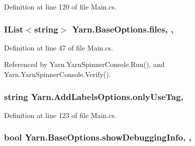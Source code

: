 Definition at line 120 of file Main.\-cs.

\hypertarget{a00031_aa93cbb1bc1d5328e0a417012621e92d2}{
\subsubsection[{files}]{\setlength{\rightskip}{0pt plus 5cm}I\-List$<$string$>$ Yarn.\-Base\-Options.\-files\hspace{0.3cm}{\ttfamily [get]}, {\ttfamily [set]}, {\ttfamily [inherited]}}}\label{a00031_aa93cbb1bc1d5328e0a417012621e92d2}


Definition at line 47 of file Main.\-cs.



Referenced by Yarn.\-Yarn\-Spinner\-Console.\-Run(), and Yarn.\-Yarn\-Spinner\-Console.\-Verify().

\hypertarget{a00027_ab6162338f9606a836f3101fe0e228249}{
\subsubsection[{only\-Use\-Tag}]{\setlength{\rightskip}{0pt plus 5cm}string Yarn.\-Add\-Labels\-Options.\-only\-Use\-Tag\hspace{0.3cm}{\ttfamily [get]}, {\ttfamily [set]}}}\label{a00027_ab6162338f9606a836f3101fe0e228249}


Definition at line 123 of file Main.\-cs.

\hypertarget{a00031_a89964ea17bd19caf00cb5bff563ed01c}{
\subsubsection[{show\-Debugging\-Info}]{\setlength{\rightskip}{0pt plus 5cm}bool Yarn.\-Base\-Options.\-show\-Debugging\-Info\hspace{0.3cm}{\ttfamily [get]}, {\ttfamily [set]}, {\ttfamily [inherited]}}}\label{a00031_a89964ea17bd19caf00cb5bff563ed01c}


